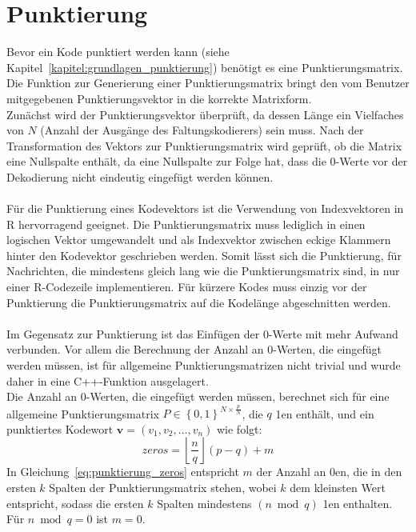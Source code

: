 \section{Punktierung}
\label{kapitel:implementierung_punktierung}
Bevor ein Kode punktiert werden kann (siehe Kapitel~\ref{kapitel:grundlagen_punktierung}) benötigt es eine Punktierungsmatrix. Die Funktion zur Generierung einer Punktierungsmatrix bringt den vom Benutzer mitgegebenen Punktierungsvektor in die korrekte Matrixform.
\\
Zunächst wird der Punktierungsvektor überprüft, da dessen Länge ein Vielfaches von $N$ (Anzahl der Ausgänge des Faltungskodierers) sein muss. Nach der Transformation des Vektors zur Punktierungsmatrix wird geprüft, ob die Matrix eine Nullspalte enthält, da eine Nullspalte zur Folge hat, dass die 0-Werte vor der Dekodierung nicht eindeutig eingefügt werden können.
\\
\\
Für die Punktierung eines Kodevektors ist die Verwendung von Indexvektoren in R hervorragend geeignet. Die Punktierungsmatrix muss lediglich in einen logischen Vektor umgewandelt und als Indexvektor zwischen eckige Klammern hinter den Kodevektor geschrieben werden. Somit lässt sich die Punktierung, für Nachrichten, die mindestens gleich lang wie die Punktierungsmatrix sind, in nur einer R-Codezeile implementieren. Für kürzere Kodes muss einzig vor der Punktierung die Punktierungsmatrix auf die Kodelänge abgeschnitten werden.
\\
\\
Im Gegensatz zur Punktierung ist das Einfügen der 0-Werte mit mehr Aufwand verbunden. Vor allem die Berechnung der Anzahl an 0-Werten, die eingefügt werden müssen, ist für allgemeine Punktierungsmatrizen nicht trivial und wurde daher in eine C++-Funktion ausgelagert.\\
Die Anzahl an 0-Werten, die eingefügt werden müssen, berechnet sich für eine allgemeine Punktierungsmatrix $P \in {\left\lbrace 0,1 \right\rbrace}^{N\times \frac{p}{N}}$, die $q$ 1en enthält, und ein punktiertes Kodewort $\mathbf{v}=\left( v_{1},v_{2},\dots ,v_{n}\right)$ wie folgt:
\begin{equation}
\mathit{zeros} = \left\lfloor \frac{n}{q} \right\rfloor \left(p-q\right)+m
\label{eq:punktierung_zeros}
\end{equation}
In Gleichung~\eqref{eq:punktierung_zeros} entspricht $m$ der Anzahl an 0en, die in den ersten $k$ Spalten der Punktierungsmatrix stehen, wobei $k$ dem kleinsten Wert entspricht, sodass die ersten $k$ Spalten mindestens $\left( n\bmod q\right)$ 1en enthalten. Für $n\bmod q=0$ ist $m=0$.

